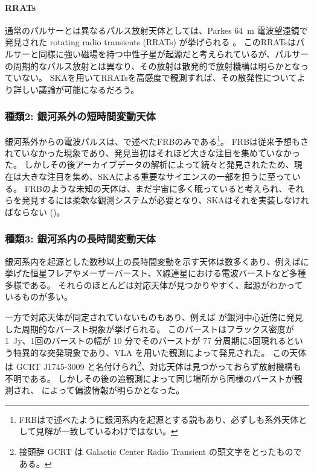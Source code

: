 \paragraph{RRATs}
通常のパルサーとは異なるパルス放射天体としては、Parkes 64~m 電波望遠鏡で発見された rotating radio transients (RRATs) が挙げられる \citep{2006Natur.439..817M}。
このRRATsはパルサーと同様に強い磁場を持つ中性子星が起源だと考えられているが、パルサーの周期的なパルス放射とは異なり、その放射は散発的で放射機構は明らかとなっていない。
SKAを用いてRRATsを高感度で観測すれば、その散発性についてより詳しい議論が可能になるだろう。


\subsubsection{種類2: 銀河系外の短時間変動天体}
銀河系外からの電波パルスは、で述べたFRBのみである\footnote{FRBはで述べたように銀河系内を起源とする説もあり、必ずしも系外天体として見解が一致しているわけではない。}。
FRBは従来予想もされていなかった現象であり、発見当初はそれほど大きな注目を集めていなかった。
しかしその後アーカイブデータの解析によって続々と発見されたため、現在は大きな注目を集め、SKAによる重要なサイエンスの一部を担うに至っている。
FRBのような未知の天体は、まだ宇宙に多く眠っていると考えられ、それらを発見するには柔軟な観測システムが必要となり、SKAはそれを実装しなければならない ()。

\subsubsection{種類3: 銀河系内の長時間変動天体}
銀河系内を起源とした数秒以上の長時間変動を示す天体は数多くあり、例えばに挙げた恒星フレアやメーザーバースト、X線連星における電波バーストなど多種多様である。
それらのほとんどは対応天体が見つかりやすく、起源がわかっているものが多い。

一方で対応天体が同定されていないものもあり、例えば\citet{2005Natur.434...50H} が銀河中心近傍に発見した周期的なバースト現象が挙げられる。
このバーストはフラックス密度が 1~Jy、1回のバーストの幅が 10 分でそのバーストが 77 分周期に5回現れるという特異的な突発現象であり、VLA を用いた観測によって発見された。
この天体は GCRT J1745-3009 と名付けられ\footnote{接頭辞 GCRT は Galactic Center Radio Transient の頭文字をとったものである。}、対応天体は見つかっておらず放射機構も不明である。
しかしその後の追観測によって同じ場所から同様のバーストが観測され、\citet{2010ApJ...712L...5R} によって偏波情報が明らかとなった。


